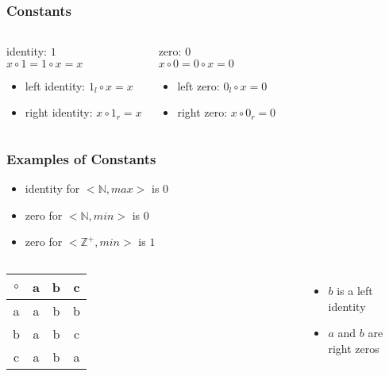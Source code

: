 \documentclass[dvipsnames]{beamer}
\begin{document}
\begin{frame}
  \frametitle{Constants}

  \begin{columns}
    \begin{definition}
      \alert{identity}: $1$\\
      $x \circ 1 = 1 \circ x = x$

      \begin{itemize}
        \item left identity: $1_l \circ x = x$
        \item right identity: $x \circ 1_r = x$
      \end{itemize}
    \end{definition}

    \pause
    \begin{definition}
      \alert{zero}: $0$\\
      $x \circ 0 = 0 \circ x = 0$

      \begin{itemize}
        \item left zero: $0_l \circ x = 0$
        \item right zero: $x \circ 0_r = 0$
      \end{itemize}
    \end{definition}
  \end{columns}
\end{frame}

\begin{frame}
  \frametitle{Examples of Constants}

  \begin{example}
    \begin{itemize}
      \item identity for $<\mathbb{N}, max>$ is $0$
      \item zero for $<\mathbb{N}, min>$ is $0$
      \item zero for $<\mathbb{Z}^+, min>$ is $1$
    \end{itemize}
  \end{example}

  \pause
  \begin{example}
    \begin{columns}
      \begin{tabular}{c||c|c|c}
        $\circ$ & a & b & c\\\hline\hline
              a & a & b & b\\\hline
              b & a & b & c\\\hline
              c & a & b & a
      \end{tabular}

      \begin{itemize}
        \item $b$ is a left identity
        \item $a$ and $b$ are right zeros
      \end{itemize}
    \end{columns}
  \end{example}
\end{frame}
\end{document}
